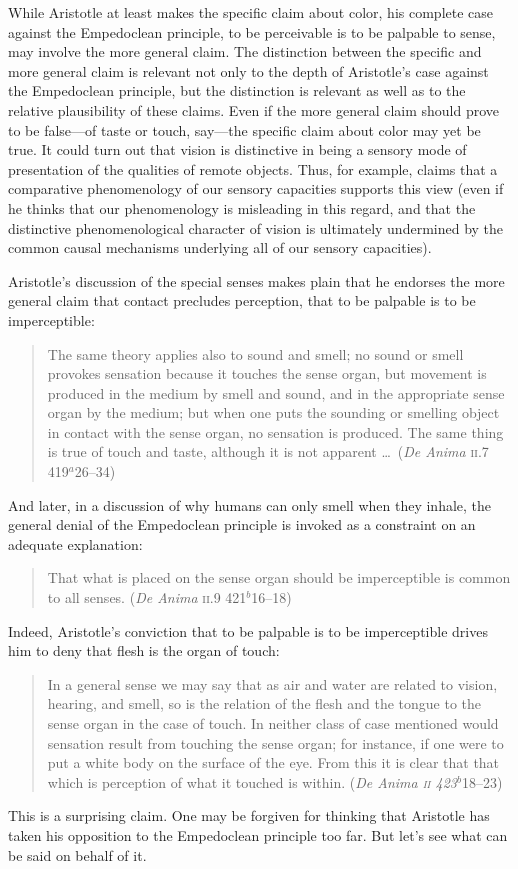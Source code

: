 While Aristotle at least makes the specific claim about color, his complete case against the Empedoclean principle, to be perceivable is to be palpable to sense, may involve the more general claim. The distinction between the specific and more general claim is relevant not only to the depth of Aristotle's case against the Empedoclean principle, but the distinction is relevant as well as to the relative plausibility of these claims. Even if the more general claim should prove to be false---of taste or touch, say---the specific claim about color may yet be true. It could turn out that vision is distinctive in being a sensory mode of presentation of the qualities of remote objects. Thus, for example, \citet[]{Broad:1952kx} claims that a comparative phenomenology of our sensory capacities supports this view (even if he thinks that our phenomenology is misleading in this regard, and that the distinctive phenomenological character of vision is ultimately undermined by the common causal mechanisms underlying all of our sensory capacities).

Aristotle's discussion of the special senses makes plain that he endorses the more general claim that contact precludes perception, that to be palpable is to be imperceptible:
\begin{quote}
	The same theory applies also to sound and smell; no sound or smell provokes sensation because it touches the sense organ, but movement is produced in the medium by smell and sound, and in the appropriate sense organ by the medium; but when one puts the sounding or smelling object in contact with the sense organ, no sensation is produced. The same thing is true of touch and taste, although it is not apparent \ldots\ (\emph{De Anima} \textsc{ii}.7 419\( ^{a} \)26--34)
\end{quote}
And later, in a discussion of why humans can only smell when they inhale, the general denial of the Empedoclean principle is invoked as a constraint on an adequate explanation:
\begin{quote}
	That what is placed on the sense organ should be imperceptible is common to all senses. (\emph{De Anima} \textsc{ii}.9 421\( ^{b} \)16--18)
\end{quote}

Indeed, Aristotle's conviction that to be palpable is to be imperceptible drives him to deny that flesh is the organ of touch:
\begin{quote}
    In a general sense we may say that as air and water are related to vision, hearing, and smell, so is the relation of the flesh and the tongue to the sense organ in the case of touch. In neither class of case mentioned would sensation result from touching the sense organ; for instance, if one were to put a white body on the surface of the eye. From this it is clear that that which is perception of what it touched is within. (\emph{De Anima \textsc{ii} 423\( ^{b} \)}18--23)
\end{quote}
This is a surprising claim. One may be forgiven for thinking that Aristotle has taken his opposition to the Empedoclean principle too far. But let's see what can be said on behalf of it.

